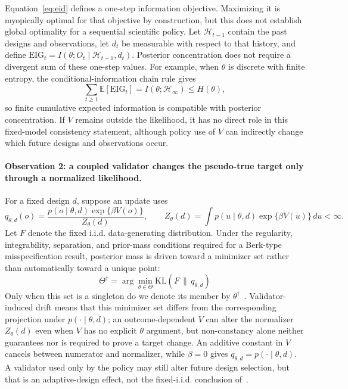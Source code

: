 \documentclass{article}
\begin{document}
Equation~\ref{eq:eid} defines a one-step information objective. Maximizing it is myopically optimal for that objective by construction, but this does not establish global optimality for a sequential scientific policy. Let $\mathcal H_{t-1}$ contain the past designs and observations, let $d_t$ be measurable with respect to that history, and define $\mathrm{EIG}_t=I(\theta;O_t\mid\mathcal H_{t-1},d_t)$. Posterior concentration does not require a divergent sum of these one-step values. For example, when $\theta$ is discrete with finite entropy, the conditional-information chain rule gives
\begin{equation}
  \sum_{t\geq 1}\mathbb{E}\!\left[\mathrm{EIG}_t\right]
  = I(\theta;\mathcal H_\infty) \leq H(\theta),
\end{equation}
so finite cumulative expected information is compatible with posterior concentration. If $V$ remains outside the likelihood, it has no direct role in this fixed-model consistency statement, although policy use of $V$ can indirectly change which future designs and observations occur.

\paragraph{Observation 2: a coupled validator changes the pseudo-true target only through a normalized likelihood.}
For a fixed design $d$, suppose an update uses
\begin{equation}
  q_{\theta,d}(o)
  = \frac{p(o\mid\theta,d)\exp\{\beta V(o)\}}
         {Z_\theta(d)},
  \qquad
  Z_\theta(d)=\int p(u\mid\theta,d)\exp\{\beta V(u)\}\,du < \infty.
\end{equation}
Let $F$ denote the fixed i.i.d. data-generating distribution. Under the regularity, integrability, separation, and prior-mass conditions required for a Berk-type misspecification result, posterior mass is driven toward a minimizer set rather than automatically toward a unique point:
\begin{equation}
  \Theta^\dagger
  = \arg\min_{\theta\in\Theta}\mathrm{KL}\!\left(F\,\|\,q_{\theta,d}\right)
\end{equation}
Only when this set is a singleton do we denote its member by $\theta^\dagger$~\citep{berk1966}. Validator-induced drift means that this minimizer set differs from the corresponding projection under $p(\cdot\mid\theta,d)$; an outcome-dependent $V$ can alter the normalizer $Z_\theta(d)$ even when $V$ has no explicit $\theta$ argument, but non-constancy alone neither guarantees nor is required to prove a target change. An additive constant in $V$ cancels between numerator and normalizer, while $\beta=0$ gives $q_{\theta,d}=p(\cdot\mid\theta,d)$. A validator used only by the policy may still alter future design selection, but that is an adaptive-design effect, not the fixed-i.i.d. conclusion of~\citet{berk1966}.
\end{document}
